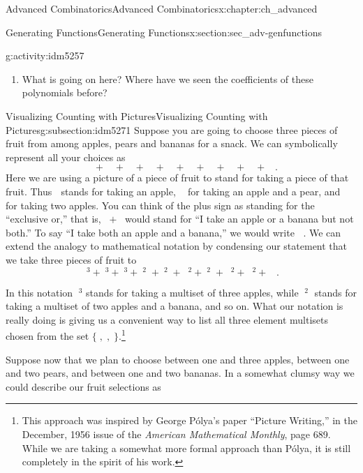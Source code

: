 \documentclass[oneside,10pt,]{book}
\numberwithin{equation}{chapter}
\newcommand{\apple}{\text{🍎}}
\newcommand{\ap}{\apple}
\newcommand{\banana}{\text{🍌}}
\newcommand{\ba}{\banana}
\newcommand{\pear}{\text{🍐}}
\newcommand{\pe}{\pear}
\begin{document}
\begin{chapterptx}{Advanced Combinatorics}{}{Advanced Combinatorics}{}{}{x:chapter:ch_advanced}
\begin{sectionptx}{Generating Functions}{}{Generating Functions}{}{}{x:section:sec_adv-genfunctions}
\begin{introduction}{}
\begin{activity}{}{g:activity:idm5257}
\begin{enumerate}[font=\bfseries,label=(\alph*),ref=\alph*]
\item{}What is going on here?  Where have we seen the coefficients of these polynomials before?%
\end{enumerate}
\end{activity}
\end{introduction}%
%
%
\typeout{************************************************}
\typeout{************************************************}
%
\begin{subsectionptx}{Visualizing Counting with Pictures}{}{Visualizing Counting with Pictures}{}{}{g:subsection:idm5271}
Suppose you are going to choose three pieces of fruit from among apples, pears and bananas for a snack.  We can symbolically represent all your choices as%
\begin{equation*}
\ap\ap\ap+\pe\pe\pe+\ba\ba\ba+\ap\ap\pe+\ap\ap\ba+\ap\pe\pe +\pe\pe\ba
+\ap\ba\ba+\pe\ba\ba+\ap\pe\ba.
\end{equation*}
Here we are using a picture of a piece of fruit to stand for taking a piece of that fruit. Thus \(\ap\) stands for taking an apple, \(\ap\pe\) for taking an apple and a pear, and \(\ap\ap\) for taking two apples.  You can think of the plus sign as standing for the ``exclusive or,'' that is, \(\ap+\ba\) would stand for ``I take an apple or a banana but not both.'' To say ``I take both an apple and a banana,'' we would write \(\ap\ba\). We can extend the analogy to mathematical notation by condensing our statement that we take three pieces of fruit to%
\begin{equation*}
\ap^3+\pe^3+\ba^3+\ap^2\pe+\ap^2\ba +\ap\pe^2+\pe^2\ba+
\ap\ba^2+\pe\ba^2 +\ap\pe\ba.
\end{equation*}
%
\par
In this notation \(\ap^3\) stands for taking a multiset of three apples, while \(\ap^2\ba\) stands for taking a multiset of two apples and a banana, and so on. What our notation is really doing is giving us a convenient way to list all three element multisets chosen from the set \(\{\ap,\pe,\ba\}\).\footnote{This approach was inspired by George Pólya's paper ``Picture Writing,'' in the December, 1956 issue of the \textsl{American Mathematical Monthly}, page 689. While we are taking a somewhat more formal approach than Pólya, it is still completely in the spirit of his work.\label{g:fn:idm5288}}%
\par
Suppose now that we plan to choose between one and three apples, between one and two pears, and between one and two bananas. In a somewhat clumsy way we could describe our fruit selections as%

\end{subsectionptx}
\end{sectionptx}
\end{chapterptx}
\end{document}
